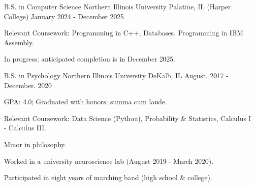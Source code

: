 

\begin{cventries}

  \cventry
  {B.S. in Computer Science} %
  {Northern Illinois University} %
    {Palatine, IL (Harper College)} %
    {January 2024 - December 2025} %
    {
      \begin{cvitems} %
        \item {Relevant Coursework: Programming in C++, Databases, Programming in IBM Assembly.}
        \item {In progress; anticipated completion is in December 2025.}
      \end{cvitems}
    }

  \cventry
  {B.S. in Psychology} %
  {Northern Illinois University} %
    {DeKalb, IL} %
    {August. 2017 - December. 2020} %
    {
      \begin{cvitems} %
        \item {GPA: 4.0; Graduated with honors; summa cum laude.}
        \item {Relevant Coursework: Data Science (Python), Probability \& Statistics, Calculus I - Calculus III.}
        \item {Minor in philosophy.}
        \item {Worked in a university neuroscience lab (August 2019 - March 2020).}
        \item {Participated in eight years of marching band (high school \& college).}
      \end{cvitems}
    }

\end{cventries}
